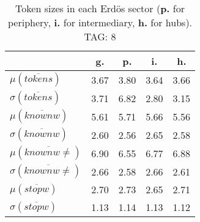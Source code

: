 \begin{table}[h!]
\begin{center}
\begin{tabular}{| l || c | c | c | c |}\hline
 & {\bf g.} & {\bf p.} & {\bf i.} & {\bf h.} \\\hline\hline
$\mu(\overline{tokens})$ & 3.67  & 3.80  & 3.64  & 3.66 \\
$\sigma(\overline{tokens})$ & 3.71  & 6.82  & 2.80  & 3.15 \\\hline
$\mu(\overline{knownw})$ & 5.61  & 5.71  & 5.66  & 5.56 \\
$\sigma(\overline{knownw})$ & 2.60  & 2.56  & 2.65  & 2.58 \\\hline
$\mu(\overline{knownw \neq})$ & 6.90  & 6.55  & 6.77  & 6.88 \\
$\sigma(\overline{knownw \neq})$ & 2.66  & 2.58  & 2.66  & 2.61 \\\hline
$\mu(\overline{stopw})$ & 2.70  & 2.73  & 2.65  & 2.71 \\
$\sigma(\overline{stopw})$ & 1.13  & 1.14  & 1.13  & 1.12 \\\hline
\end{tabular}
\caption{Token sizes in each Erd\"os sector ({{\bf p.}} for periphery, {{\bf i.}} for intermediary, {{\bf h.}} for hubs). TAG: 8}
\end{center}
\end{table}